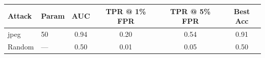 \begin{tabular}{llcccc}
\toprule
Attack & Param & AUC & TPR @ 1\% FPR & TPR @ 5\% FPR & Best Acc \\
\midrule
jpeg & 50 & 0.94 & 0.20 & 0.54 & 0.91 \\
Random & — & 0.50 & 0.01 & 0.05 & 0.50 \\
\bottomrule
\end{tabular}
